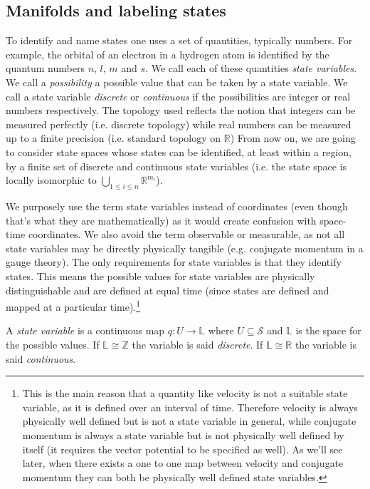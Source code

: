 \documentclass[smallextended]{svjour3}
\numberwithin{equation}{section}
\begin{document}
\subsection{Manifolds and labeling states}

To identify and name states one uses a set of quantities, typically numbers. For example, the orbital of an electron in a hydrogen atom is identified by the quantum numbers $n$, $l$, $m$ and $s$. We call each of these quantities \emph{state variables}. We call a \emph{possibility} a possible value that can be taken by a state variable. We call a state variable \emph{discrete} or \emph{continuous} if the possibilities are integer or real numbers respectively. The topology used reflects the notion that integers can be measured perfectly (i.e. discrete topology) while real numbers can be measured up to a finite precision (i.e. standard topology on $\mathbb{R}$) From now on, we are going to consider state spaces whose states can be identified, at least within a region, by a finite set of discrete and continuous state variables (i.e. the state space is locally isomorphic to $\bigcup\limits_{1 \leq i \leq n} \mathbb{R}^{m_i}$).

We purposely use the term state variables instead of coordinates (even though that's what they are mathematically) as it would create confusion with space-time coordinates. We also avoid the term observable or measurable, as not all state variables may be directly physically tangible (e.g. conjugate momentum in a gauge theory). The only requirements for state variables is that they identify states. This means the possible values for state variables are physically distinguishable and are defined at equal time (since states are defined and mapped at a particular time).\footnote{This is the main reason that a quantity like velocity is not a suitable state variable, as it is  defined over an interval of time. Therefore velocity is always physically well defined but is not a state variable in general, while conjugate momentum is always a state variable but is not physically well defined by itself (it requires the vector potential to be specified as well). As we'll see later, when there exists a one to one map between velocity and conjugate momentum they can both be physically well defined state variables.}

\begin{prop}\label{prop:state_variable}
	A \emph{state variable} is a continuous map $q : U \rightarrow \mathbb{L}$ where $U \subseteq \mathcal{S}$ and $\mathbb{L}$ is the space for the possible values. If $\mathbb{L}\cong \mathbb{Z}$ the variable is said \emph{discrete}. If $\mathbb{L}\cong \mathbb{R}$ the variable is said \emph{continuous}.
\end{prop}
\end{document}
